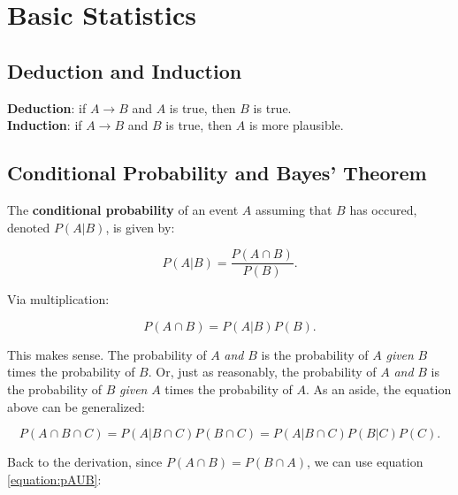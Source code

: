 \section{Basic Statistics}

\subsection{Deduction and Induction}

\textbf{Deduction}: if $A \rightarrow B$ and $A$ is true, then $B$ is true. \\
\textbf{Induction}: if $A \rightarrow B$ and $B$ is true, then $A$ is more plausible. \\

\subsection{Conditional Probability and Bayes' Theorem}

The \textbf{conditional probability} of an event $A$ assuming that $B$ has occured, denoted $P(A|B)$, is given by:

\begin{equation}
P(A|B)=\frac{P(A \cap B)}{P(B)}.
\end{equation}

Via multiplication:

\begin{equation}
P(A \cap B) = P(A|B)P(B).
\label{equation:pAUB}
\end{equation}

This makes sense. The probability of $A$ \textit{and} $B$ is the probability of $A$ \textit{given} $B$ times the probability of $B$. Or, just as reasonably, the probability of $A$ \textit{and} $B$ is the probability of $B$ \textit{given} $A$ times the probability of $A$. As an aside, the equation above can be generalized:

\begin{equation}
P(A \cap B \cap C) = P(A|B \cap C) P(B \cap C) = P(A|B \cap C) P(B|C) P(C).
\end{equation}

Back to the derivation, since $P(A \cap B) = P(B \cap A)$, we can use equation \ref{equation:pAUB}:

